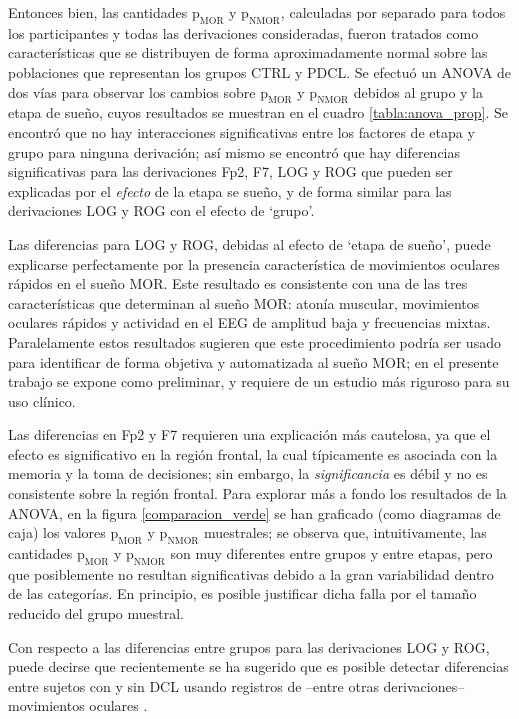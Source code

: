 \documentclass[12pt,letterpaper]{book}
\begin{document}
Entonces bien, las cantidades $\text{p}_{\text{MOR}}$ y $\text{p}_{\text{NMOR}}$, calculadas por separado para todos los participantes y todas las derivaciones consideradas, fueron tratados como características que se distribuyen de forma aproximadamente normal sobre las poblaciones que representan los grupos CTRL y PDCL.
%
Se efectuó un ANOVA de dos vías para observar los cambios sobre $\text{p}_{\text{MOR}}$ y $\text{p}_{\text{NMOR}}$ debidos al grupo y la etapa de sueño, cuyos resultados se muestran en el cuadro \ref{tabla:anova_prop}.
%
Se encontró que no hay interacciones significativas entre los factores de etapa y grupo para ninguna derivación; así mismo se encontró que hay diferencias significativas para las derivaciones Fp2, F7, LOG y ROG que pueden ser explicadas por el \textit{efecto} de la etapa se sueño, y de forma similar para las derivaciones LOG y ROG con el efecto de `grupo'.

Las diferencias para LOG y ROG, debidas al efecto de `etapa de sueño', puede explicarse perfectamente por la presencia característica de movimientos oculares rápidos en el sueño MOR. 
%
Este resultado es consistente con una de las tres características que determinan al sueño MOR: atonía muscular, movimientos oculares rápidos y actividad en el EEG de amplitud baja y frecuencias mixtas.
%
Paralelamente estos resultados sugieren que este procedimiento podría ser usado para identificar de forma objetiva y automatizada al sueño MOR; en el presente trabajo se expone como preliminar, y requiere de un estudio más riguroso para su uso clínico.

Las diferencias en Fp2 y F7 requieren una explicación más cautelosa, ya que el efecto es significativo en la región frontal, la cual típicamente es asociada con la memoria y la toma de decisiones; sin embargo, la \textit{significancia} es débil y no es consistente sobre la región frontal.
%
Para explorar más a fondo los resultados de la ANOVA, en la figura \ref{comparacion_verde} se han graficado (como diagramas de caja) los valores $\text{p}_{\text{MOR}}$ y $\text{p}_{\text{NMOR}}$ muestrales; se observa que, intuitivamente, las cantidades $\text{p}_{\text{MOR}}$ y $\text{p}_{\text{NMOR}}$ son muy diferentes entre grupos y entre etapas, pero que posiblemente no resultan significativas debido a la gran variabilidad dentro de las categorías.
%
En principio, es posible justificar dicha falla por el tamaño reducido del grupo muestral.

Con respecto a las diferencias entre grupos para las derivaciones LOG y ROG, puede decirse que recientemente se ha sugerido que es posible detectar diferencias entre sujetos con y sin DCL usando registros de --entre otras derivaciones-- movimientos oculares \cite{FRONTIERS}.
\end{document}
